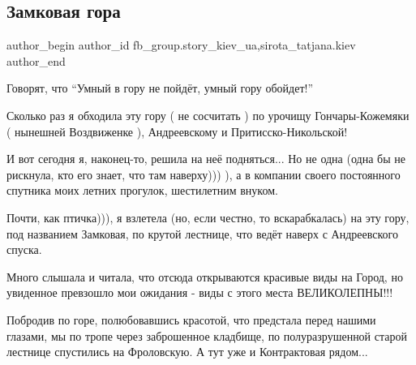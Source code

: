  
 
 
 
 
 
\subsection{Замковая гора}
\label{sec:21_08_2021.fb.fb_group.story_kiev_ua.1.zamkovaja_gora}
 
\ifcmt
 author_begin
   author_id fb_group.story_kiev_ua,sirota_tatjana.kiev
 author_end
\fi

Говорят, что \enquote{Умный в гору не пойдёт, умный гору обойдет!}

Сколько раз я обходила эту гору ( не сосчитать ) по урочищу
Гончары-Кожемяки ( нынешней Воздвиженке ), Андреевскому и Притисско-Никольской!

\begin{multicols}{2} %
\setlength{\parindent}{0pt}

\end{multicols} %

И вот сегодня я, наконец-то, решила на неё подняться... Но не одна (одна бы не
рискнула, кто его знает, что там наверху))) ), а в компании своего постоянного
спутника моих летних прогулок, шестилетним внуком.

Почти, как птичка))), я взлетела (но, если честно, то вскарабкалась) на эту гору, под
названием Замковая, по крутой лестнице, что ведёт наверх с Андреевского спуска.

Много слышала и читала, что отсюда открываются красивые виды на Город, но 
увиденное превзошло мои ожидания - виды с этого места ВЕЛИКОЛЕПНЫ!!!

Побродив по горе, полюбовавшись красотой, что предстала перед нашими глазами, мы
по тропе через заброшенное кладбище, по полуразрушенной старой лестнице
спустились на Фроловскую. А тут уже и Контрактовая рядом...

